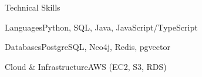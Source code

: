 \documentclass[
	11pt
]{../../../template}
\begin{document}
	\begin{rSection}{T}{echnical Skills}
		\begin{rSet}{Languages}{Python, SQL, Java, JavaScript/TypeScript}
		\end{rSet}
		\begin{rSet}{Databases}{PostgreSQL, Neo4j, Redis, pgvector}
		\end{rSet}
		\begin{rSet}{Cloud \& Infrastructure}{AWS (EC2, S3, RDS)}
		\end{rSet}
	\end{rSection}
\end{document}
